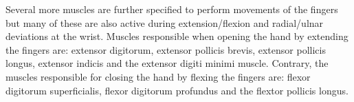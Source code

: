 Several more muscles are further specified to perform movements of the fingers but many of these are also active during extension/flexion and radial/ulnar deviations at the wrist. Muscles responsible when opening the hand by extending the fingers are: extensor digitorum, extensor pollicis brevis, extensor pollicis longus, extensor indicis and the extensor digiti minimi muscle. Contrary, the muscles responsible for closing the hand by flexing the fingers are: flexor digitorum superficialis, flexor digitorum profundus and the flextor pollicis longus. \cite{Martini2012}







%
%
%
%
